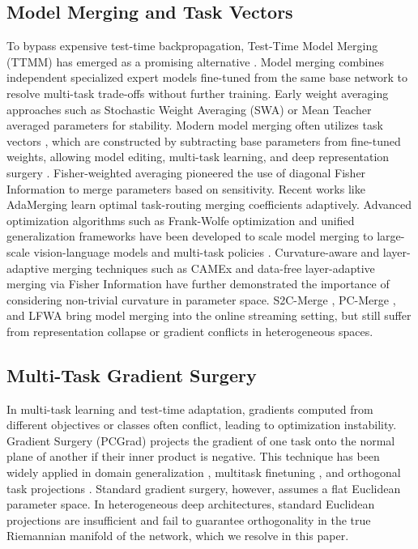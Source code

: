 \documentclass{article}
\theoremstyle{plain}
\theoremstyle{definition}
\theoremstyle{remark}
\begin{document}
\subsection{Model Merging and Task Vectors}
To bypass expensive test-time backpropagation, Test-Time Model Merging (TTMM) has emerged as a promising alternative \cite{yang2024adamerging, anonymous2026s2c}. Model merging combines independent specialized expert models fine-tuned from the same base network to resolve multi-task trade-offs without further training. Early weight averaging approaches such as Stochastic Weight Averaging (SWA) \cite{izmailov2018averagingweights} or Mean Teacher \cite{tarvainen2017meanteachers, tarvainen2017weightaveragedconsistency} averaged parameters for stability. Modern model merging often utilizes task vectors \cite{saadati2024dimatdecentralized}, which are constructed by subtracting base parameters from fine-tuned weights, allowing model editing, multi-task learning, and deep representation surgery \cite{yang2024surgeryvbridging}.
Fisher-weighted averaging \cite{matena2021mergingmodels} pioneered the use of diagonal Fisher Information to merge parameters based on sensitivity. Recent works like AdaMerging \cite{yang2024adamerging, yang2023adamergingadaptive} learn optimal task-routing merging coefficients adaptively. Advanced optimization algorithms such as Frank-Wolfe optimization \cite{chen2025fwmergingscaling} and unified generalization frameworks \cite{li2026unifiedgeneralization, khan2024sokfinding} have been developed to scale model merging to large-scale vision-language models \cite{karmanov2024efficienttesttime} and multi-task policies \cite{lawson2023mergingdecision}. Curvature-aware and layer-adaptive merging techniques such as CAMEx \cite{dung2025camexcurvatureaware} and data-free layer-adaptive merging via Fisher Information \cite{xia2026datafreelayeradaptive} have further demonstrated the importance of considering non-trivial curvature in parameter space. S2C-Merge \cite{anonymous2026s2c}, PC-Merge \cite{anonymous2026pc}, and LFWA \cite{anonymous2026lfwa} bring model merging into the online streaming setting, but still suffer from representation collapse or gradient conflicts in heterogeneous spaces.

\subsection{Multi-Task Gradient Surgery}
In multi-task learning and test-time adaptation, gradients computed from different objectives or classes often conflict, leading to optimization instability. Gradient Surgery (PCGrad) \cite{yu2020gradientsurgery} projects the gradient of one task onto the normal plane of another if their inner product is negative. This technique has been widely applied in domain generalization \cite{mansilla2021domaingeneralization}, multitask finetuning \cite{csn2023multitaskfinetuning, csn2024rhapsodytheme}, and orthogonal task projections \cite{yadav2025ongorthogonal}. Standard gradient surgery, however, assumes a flat Euclidean parameter space. In heterogeneous deep architectures, standard Euclidean projections are insufficient and fail to guarantee orthogonality in the true Riemannian manifold of the network, which we resolve in this paper.
\end{document}
